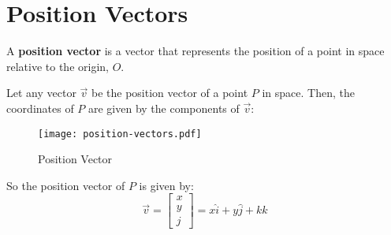 \section{Position Vectors}

\begin{definition}
  A {\bf position vector} is a vector that represents the position of a point in space relative to the origin, $O$. 
\end{definition}

Let any vector $\vec{v}$ be the position vector of a point $P$ in space. Then, the coordinates of $P$ are given by the components of $\vec{v}$:
\begin{figure}[H]
\centering
   \texttt{[image: position-vectors.pdf]}
   \caption{Position Vector}
   \label{fig:figure-4-position-vector}
\end{figure}

So the position vector of $P$ is given by:
\begin{equation}
  \vec{v} = \begin{bmatrix} x \\ y \\ j \end{bmatrix}  =x\hat{i} + y\hat{j} + k\hat{k}
\end{equation}
\clearpage


